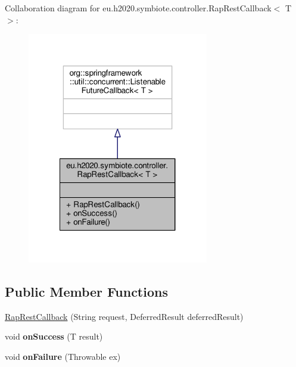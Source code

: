 Collaboration diagram for eu.\+h2020.\+symbiote.\+controller.\+Rap\+Rest\+Callback$<$ T $>$\+:
\nopagebreak
\begin{figure}[H]
\begin{center}
\leavevmode
\includegraphics[width=224pt]{classeu_1_1h2020_1_1symbiote_1_1controller_1_1RapRestCallback__coll__graph}
\end{center}
\end{figure}
\subsection*{Public Member Functions}
\begin{DoxyCompactItemize}
\item 
\hyperlink{classeu_1_1h2020_1_1symbiote_1_1controller_1_1RapRestCallback_a86d21f4cafc340a56c2c398fde646ffc}{Rap\+Rest\+Callback} (String request, Deferred\+Result deferred\+Result)
\item 
\mbox{\label{classeu_1_1h2020_1_1symbiote_1_1controller_1_1RapRestCallback_a3b7d95cf0854add6e202f0cc9a4e481a}} 
void {\bfseries on\+Success} (T result)
\item 
\mbox{\label{classeu_1_1h2020_1_1symbiote_1_1controller_1_1RapRestCallback_a240e16518b44359ee628e5e6970c9898}} 
void {\bfseries on\+Failure} (Throwable ex)
\end{DoxyCompactItemize}


